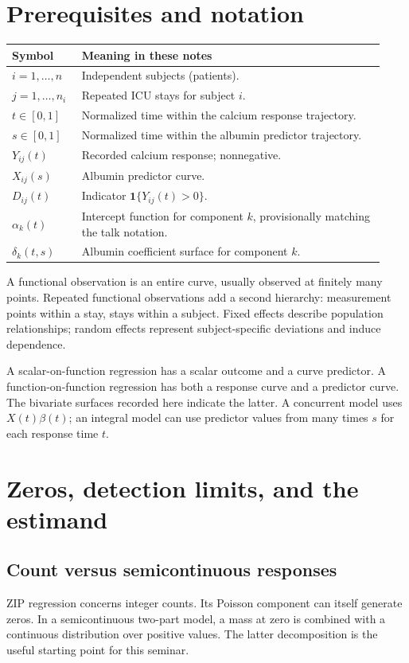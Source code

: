 \documentclass[11pt]{article}
\begin{document}
\section{Prerequisites and notation}
\begin{longtable}{p{0.17\linewidth}p{0.76\linewidth}}
\toprule Symbol & Meaning in these notes\\\midrule
$i=1,\ldots,n$ & Independent subjects (patients).\\
$j=1,\ldots,n_i$ & Repeated ICU stays for subject $i$.\\
$t\in[0,1]$ & Normalized time within the calcium response trajectory.\\
$s\in[0,1]$ & Normalized time within the albumin predictor trajectory.\\
$Y_{ij}(t)$ & Recorded calcium response; nonnegative.\\
$X_{ij}(s)$ & Albumin predictor curve.\\
$D_{ij}(t)$ & Indicator $\mathbf1\{Y_{ij}(t)>0\}$.\\
$\alpha_k(t)$ & Intercept function for component $k$, provisionally matching the talk notation.\\
$\delta_k(t,s)$ & Albumin coefficient surface for component $k$.\\\bottomrule
\end{longtable}
A functional observation is an entire curve, usually observed at finitely many points. Repeated functional observations add a second hierarchy: measurement points within a stay, stays within a subject. Fixed effects describe population relationships; random effects represent subject-specific deviations and induce dependence.

A scalar-on-function regression has a scalar outcome and a curve predictor. A function-on-function regression has both a response curve and a predictor curve. The bivariate surfaces recorded here indicate the latter. A concurrent model uses $X(t)\beta(t)$; an integral model can use predictor values from many times $s$ for each response time $t$.
\section{Zeros, detection limits, and the estimand}
\subsection{Count versus semicontinuous responses}
ZIP regression concerns integer counts. Its Poisson component can itself generate zeros. In a semicontinuous two-part model, a mass at zero is combined with a continuous distribution over positive values. The latter decomposition is the useful starting point for this seminar.
\end{document}
